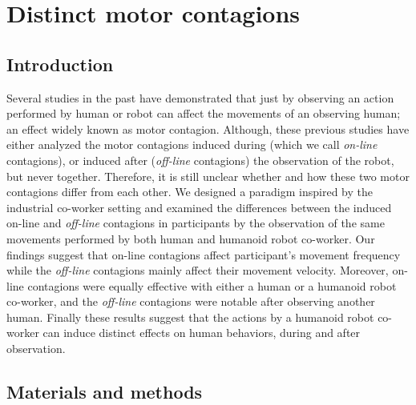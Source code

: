 
{\color{blue}\chapter{Distinct motor contagions}\label{distinct motor contagion}}

\section{Introduction}

Several studies in the past have demonstrated that just by observing an action performed by human or robot can affect the movements of an observing human; an effect widely known as motor contagion. Although, these previous studies have either analyzed the motor contagions induced during (which we call \emph{on-line} contagions), or induced after (\emph{off-line} contagions) the observation of the robot, but never together. Therefore, it is still unclear whether and how these two motor contagions differ from each other. We designed a paradigm inspired by the industrial co-worker setting and examined the differences between the induced on-line and \textit{off-line} contagions in participants by the observation of the same movements performed by both human and humanoid robot co-worker. Our findings suggest that on-line contagions affect participant's movement frequency while the \textit{off-line} contagions mainly affect their movement velocity. Moreover, on-line contagions were equally effective with either a human or a humanoid robot co-worker, and the \textit{off-line} contagions were notable after observing another human. Finally these results suggest that the actions by a humanoid robot co-worker can induce distinct effects on human behaviors, during and after observation.

\clearpage



\clearpage
\section{Materials and methods}


